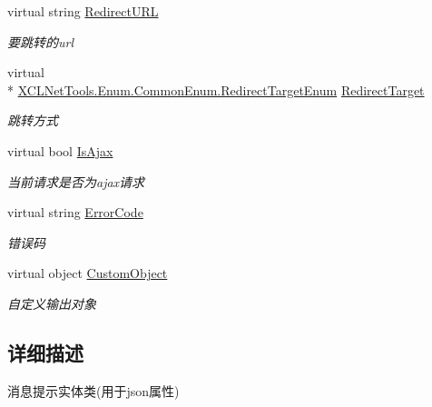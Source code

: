 \begin{DoxyCompactItemize}
virtual string \hyperlink{class_x_c_l_net_tools_1_1_message_1_1_message_model_a571c6e0204605733f900eb3f906e038d}{Redirect\-U\-R\-L}
\begin{DoxyCompactList}\small\item\em 要跳转的url \end{DoxyCompactList}\item 
virtual \\*
\hyperlink{class_x_c_l_net_tools_1_1_enum_1_1_common_enum_a1cd31513e5ecf78c77d76be7954ae2f4}{X\-C\-L\-Net\-Tools.\-Enum.\-Common\-Enum.\-Redirect\-Target\-Enum} \hyperlink{class_x_c_l_net_tools_1_1_message_1_1_message_model_a318553f7c9db2b2c685e4944feb2901e}{Redirect\-Target}
\begin{DoxyCompactList}\small\item\em 跳转方式 \end{DoxyCompactList}\item 
virtual bool \hyperlink{class_x_c_l_net_tools_1_1_message_1_1_message_model_a1ea24cc20f05516f6266af92cc06479a}{Is\-Ajax}
\begin{DoxyCompactList}\small\item\em 当前请求是否为ajax请求 \end{DoxyCompactList}\item 
virtual string \hyperlink{class_x_c_l_net_tools_1_1_message_1_1_message_model_ab169d7bab20868e935d775459b72e625}{Error\-Code}
\begin{DoxyCompactList}\small\item\em 错误码 \end{DoxyCompactList}\item 
virtual object \hyperlink{class_x_c_l_net_tools_1_1_message_1_1_message_model_a8065226d89965a09b9ff8e69ba9974ca}{Custom\-Object}
\begin{DoxyCompactList}\small\item\em 自定义输出对象 \end{DoxyCompactList}\end{DoxyCompactItemize}


\subsection{详细描述}
消息提示实体类(用于json属性) 



